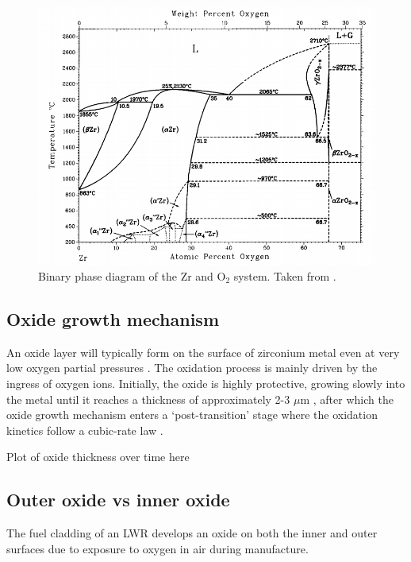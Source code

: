 \begin{figure}[htp]
\centering
\includegraphics[width=14cm]{images/zro2_binary_phase.png}
\caption[Binary phase diagram of the Zr and O$_{2}$ system.]{Binary phase diagram of the Zr and O$_{2}$ system. Taken from \cite{Abriata1986}.}
\label{figure:binary_phase_diagram}
\end{figure}

\subsection{Oxide growth mechanism}

An oxide layer will typically form on the surface of zirconium metal even at very low oxygen partial pressures \cite{causey2005review}. The oxidation process is mainly driven by the ingress of oxygen ions. Initially, the oxide is highly protective, growing slowly into the metal until it reaches a thickness of approximately 2-3 $\mu$m \cite{garzarolli1991oxide,dawson1968kinetics}, after which the oxide growth mechanism enters a `post-transition' stage where the oxidation kinetics follow a cubic-rate law  \cite{porte1960oxidation}.

Plot of oxide thickness over time here

\subsection{Outer oxide vs inner oxide}
The fuel cladding of an LWR develops an oxide on both the inner and outer surfaces due to exposure to oxygen in air during manufacture. 

